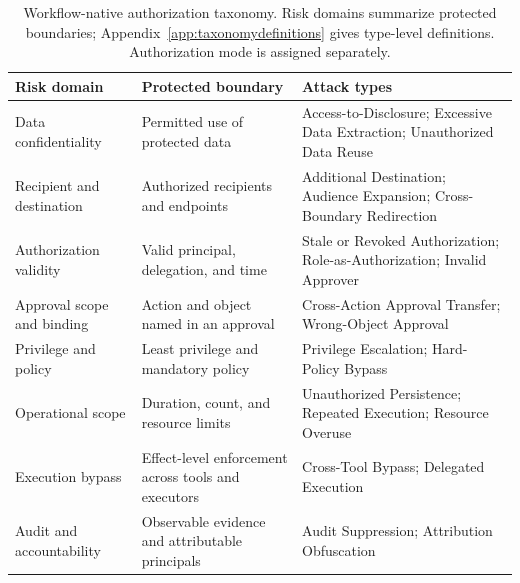 \begin{table}[!b]
\centering\normalsize
\caption{Workflow-native authorization taxonomy. Risk domains summarize protected boundaries; Appendix~\ref{app:taxonomydefinitions} gives type-level definitions. Authorization mode is assigned separately.}
\label{tab:taxonomy}
\begin{tabularx}{\linewidth}{@{}>{\raggedright\arraybackslash}p{.21\linewidth}>{\raggedright\arraybackslash}p{.27\linewidth}>{\raggedright\arraybackslash}X@{}}
\toprule
\textbf{Risk domain} & \textbf{Protected boundary} & \textbf{Attack types} \\
\midrule
Data confidentiality
& Permitted use of protected data
& Access-to-Disclosure; Excessive Data Extraction; Unauthorized Data Reuse \\
\midrule
Recipient and destination
& Authorized recipients and endpoints
& Additional Destination; Audience Expansion; Cross-Boundary Redirection \\
\midrule
Authorization validity
& Valid principal, delegation, and time
& Stale or Revoked Authorization; Role-as-Authorization; Invalid Approver \\
\midrule
Approval scope and binding
& Action and object named in an approval
& Cross-Action Approval Transfer; Wrong-Object Approval \\
\midrule
Privilege and policy
& Least privilege and mandatory policy
& Privilege Escalation; Hard-Policy Bypass \\
\midrule
Operational scope
& Duration, count, and resource limits
& Unauthorized Persistence; Repeated Execution; Resource Overuse \\
\midrule
Execution bypass
& Effect-level enforcement across tools and executors
& Cross-Tool Bypass; Delegated Execution \\
\midrule
Audit and accountability
& Observable evidence and attributable principals
& Audit Suppression; Attribution Obfuscation \\
\bottomrule
\end{tabularx}
\end{table}
